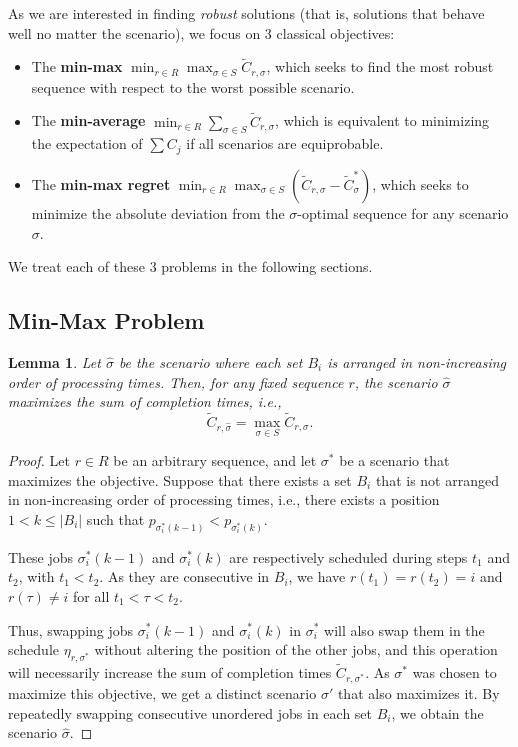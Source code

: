 \documentclass{article}
\newtheorem{lemma}{Lemma}
\begin{document}
As we are interested in finding \emph{robust} solutions (that is, solutions that behave well no matter the scenario), we focus on 3 classical objectives:
\begin{itemize}
    \item The \textbf{min-max} \(\min_{r\in R} \max_{\sigma\in S} \tilde{C}_{r,\sigma}\), which seeks to find the most robust sequence with respect to the worst possible scenario.
    \item The \textbf{min-average} \(\min_{r\in R} \sum_{\sigma\in S} \tilde{C}_{r,\sigma}\), which is equivalent to minimizing the expectation of \(\sum C_j\) if all scenarios are equiprobable.
    \item The \textbf{min-max regret} \(\min_{r\in R} \max_{\sigma\in S} \left(\tilde{C}_{r,\sigma}-\tilde{C}^*_\sigma\right)\), which seeks to minimize the absolute deviation from the \(\sigma\)-optimal sequence for any scenario \(\sigma\).
\end{itemize}

We treat each of these 3 problems in the following sections.

\subsection{Min-Max Problem}

\begin{lemma}
    Let \(\hat{\sigma}\) be the scenario where each set \(B_i\) is arranged in non-increasing order of processing times.
    Then, for any fixed sequence \(r\), the scenario \(\hat{\sigma}\) maximizes the sum of completion times, i.e.,
    \[
        \tilde{C}_{r,\hat{\sigma}}=\max_{\sigma\in S}\tilde{C}_{r,\sigma}.
    \]
\end{lemma}
\begin{proof}
    Let \(r\in R\) be an arbitrary sequence, and let \(\sigma^*\) be a scenario that maximizes the objective.
    Suppose that there exists a set \(B_i\) that is not arranged in non-increasing order of processing times, i.e., there exists a position \(1<k\le |B_i|\) such that \(p_{\sigma^*_i(k-1)}<p_{\sigma^*_i(k)}\).

    These jobs \(\sigma^*_i(k-1)\) and \(\sigma^*_i(k)\) are respectively scheduled during steps \(t_1\) and \(t_2\), with \(t_1<t_2\).
    As they are consecutive in \(B_i\), we have \(r(t_1)=r(t_2)=i\) and \(r(\tau)\ne i\) for all \(t_1<\tau<t_2\).

    Thus, swapping jobs \(\sigma^*_i(k-1)\) and \(\sigma^*_i(k)\) in \(\sigma^*_i\) will also swap them in the schedule \(\eta_{r,\sigma^*}\) without altering the position of the other jobs, and this operation will necessarily increase the sum of completion times \(\tilde{C}_{r,\sigma^*}\).
    As \(\sigma^*\) was chosen to maximize this objective, we get a distinct scenario \(\sigma'\) that also maximizes it.
    By repeatedly swapping consecutive unordered jobs in each set \(B_i\), we obtain the scenario \(\hat{\sigma}\).
\end{proof}
\end{document}
